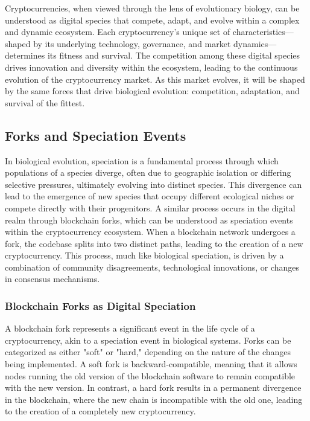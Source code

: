 \documentclass[12pt,twoside]{article}
\begin{document}
Cryptocurrencies, when viewed through the lens of evolutionary biology, can be understood as digital species that compete, adapt, and evolve within a complex and dynamic ecosystem. Each cryptocurrency's unique set of characteristics—shaped by its underlying technology, governance, and market dynamics—determines its fitness and survival. The competition among these digital species drives innovation and diversity within the ecosystem, leading to the continuous evolution of the cryptocurrency market. As this market evolves, it will be shaped by the same forces that drive biological evolution: competition, adaptation, and survival of the fittest.

\subsection{Forks and Speciation Events}

In biological evolution, speciation is a fundamental process through which populations of a species diverge, often due to geographic isolation or differing selective pressures, ultimately evolving into distinct species. This divergence can lead to the emergence of new species that occupy different ecological niches or compete directly with their progenitors. A similar process occurs in the digital realm through blockchain forks, which can be understood as speciation events within the cryptocurrency ecosystem. When a blockchain network undergoes a fork, the codebase splits into two distinct paths, leading to the creation of a new cryptocurrency. This process, much like biological speciation, is driven by a combination of community disagreements, technological innovations, or changes in consensus mechanisms.

\subsubsection{Blockchain Forks as Digital Speciation}

A blockchain fork represents a significant event in the life cycle of a cryptocurrency, akin to a speciation event in biological systems. Forks can be categorized as either "soft" or "hard," depending on the nature of the changes being implemented. A soft fork is backward-compatible, meaning that it allows nodes running the old version of the blockchain software to remain compatible with the new version. In contrast, a hard fork results in a permanent divergence in the blockchain, where the new chain is incompatible with the old one, leading to the creation of a completely new cryptocurrency.
\end{document}
